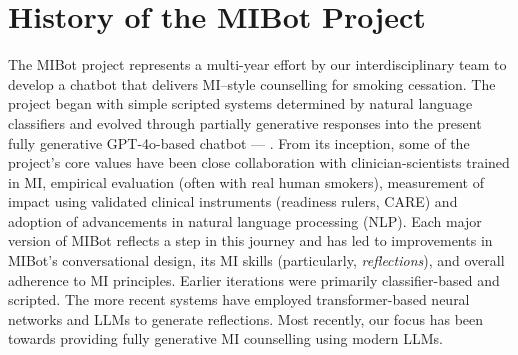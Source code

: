 \chapter{History of the MIBot Project}

\label{app:mibot_version_list}

\noindent The MIBot project represents a multi-year effort by our interdisciplinary team to develop a chatbot that delivers MI–style counselling for smoking cessation. The project began with simple scripted systems determined by natural language classifiers and evolved through partially generative responses into the present fully generative GPT-4o-based chatbot --- \sysnamewithv. From its inception, some of the project's core values have been close collaboration with clinician-scientists trained in MI, empirical evaluation (often with real human smokers), measurement of impact using validated clinical instruments (readiness rulers, CARE) and adoption of advancements in natural language processing (NLP). Each major version of MIBot reflects a step in this journey and has led to improvements in MIBot's conversational design, its MI skills (particularly, \textit{reflections}), and overall adherence to MI principles. Earlier iterations were primarily classifier-based and scripted. The more recent systems have employed transformer-based neural networks and LLMs to generate reflections. Most recently, our focus has been towards providing fully generative MI counselling using modern LLMs. 




